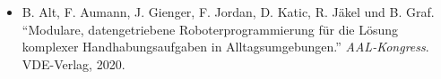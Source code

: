 \begin{itemize}
    \item B. Alt, F. Aumann, J. Gienger, F. Jordan, D. Katic, R. Jäkel und B. Graf. "`Modulare, datengetriebene Roboterprogrammierung für die Lösung komplexer Handhabungsaufgaben in Alltagsumgebungen."' \textit{AAL-Kongress}. VDE-Verlag, 2020.
\end{itemize}